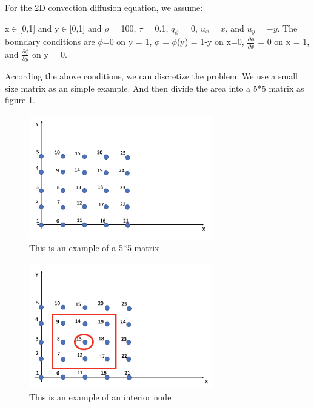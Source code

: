 \documentclass{article}
\begin{document}
\begin{spacing}{1.1}
\begin{itemize}

    For the 2D convection diffusion equation, we assume: \newline\newline
    
    x$\in$[0,1] and y$  \in$[0,1] and $\rho$ = 100, $\tau$ = 0.1, $q_\phi$ = 0, $u_x=x$, and $u_y=-y$. The boundary conditions are $\phi$=0 on y = 1, $\phi$ = $\phi$(y) = 1-y on x=0, $\frac{\partial \phi}{\partial x}$ = 0 on x = 1, and $\frac{\partial \phi}{\partial y}$ on y = 0. \newline\newline
    
    According the above conditions, we can discretize the problem. We use a small size matrix as an simple example. And then divide the area into a 5*5 matrix as figure 1.\newline\newline
    
    \begin{figure}[H]
    \centering
    \includegraphics[width=8.0cm]{figure1.png}
    \caption{This is an example of a 5*5 matrix}
    \label{figure 1.1}
    \end{figure}

    
    \begin{figure}[H]
    \centering
    \includegraphics[width=8.0cm]{figure2.png}
    \caption{This is an example of an interior node}
    \label{figure 2}
    \end{figure}
    

\end{itemize}
\end{spacing}
\end{document}
